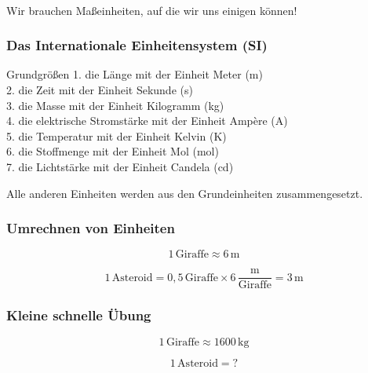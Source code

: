 \documentclass{beamer}
\begin{document}
\begin{frame}
\begin{columns}
\begin{column}{5cm}
\end{column}
 


\end{columns}


$\,$\\[0.5 cm]
Wir brauchen Maßeinheiten, auf die wir uns einigen können! 

\end{frame}



\begin{frame}

\frametitle{Das Internationale Einheitensystem (SI)}


\begin{block}{Grundgrößen}
1. die Länge mit der Einheit Meter (m) \\
2. die Zeit mit der Einheit Sekunde (s) \\
3. die Masse mit der Einheit Kilogramm (kg) \\
4. die elektrische Stromstärke mit der Einheit Ampère (A) \\
5. die Temperatur mit der Einheit Kelvin (K) \\
6. die Stoffmenge mit der Einheit Mol (mol) \\
7. die Lichtstärke mit der Einheit Candela (cd) \\
\end{block}

\pause

Alle anderen Einheiten werden aus den Grundeinheiten zusammengesetzt. 

\end{frame}


\begin{frame}
\frametitle{Umrechnen von Einheiten}

\[1\, \text{Giraffe} \approx 6\,\text{m} \]

\[
1\,\text{Asteroid} = 0,5\, \text{Giraffe} \times 6\, \frac{\text{m}}{\text{Giraffe}} = 3\,\text{m}
\]


\end{frame}


\begin{frame}
\frametitle{Kleine schnelle Übung}

\[1\, \text{Giraffe} \approx 1600\,\text{kg} \]

\[
1\,\text{Asteroid} =  ?
\]


\end{frame}
\end{document}
